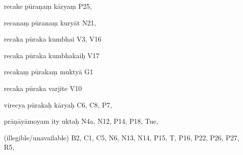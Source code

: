 \begin{ekdosis}
\begin{marma}[hp01_055]
\begin{marma}[hp02_009]
\begin{marma}[hp02_011]
\begin{marma}[hp02_73a]
\item[recake pūraṇaṃ kāryaṃ] P25,
\item[recanaṃ pūranaṃ kuryāt] N21,
\item[recaka pūraka kumbhai] V3, V16
\item[recaka pūraka kumbhakaiḥ] V17
\item[recakaṃ pūrakaṃ muktyā] G1
\item[recaka pūraka varjite] V10
\item[virecya pūrakaḥ kāryaḥ] C6, C8, P7,
\item[prāṇāyāmoyam ity uktaḥ] N4a, N12, P14, P18, Tue,
\item[(illegible/unavailable)] B2, C1, C5, N6, N13, N14, P15, T, P16, P22, P26, P27, R5,
  \begin{description}

    \end{description}
 \end{marma}


\end{marma}
\end{marma}
\end{marma}
\end{ekdosis}
